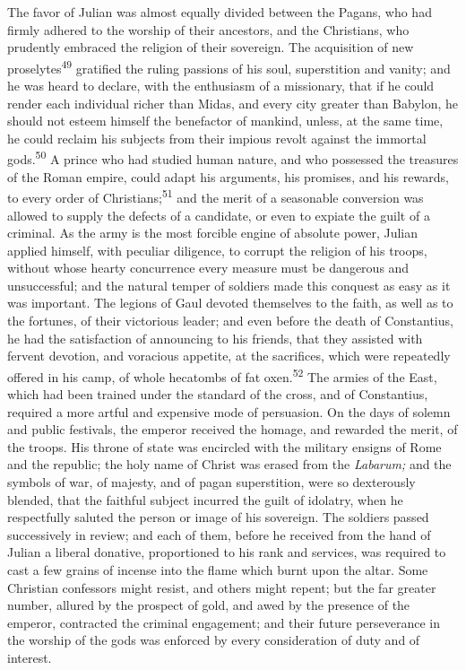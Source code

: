 The favor of Julian was almost equally divided between the
Pagans, who had firmly adhered to the worship of their ancestors,
and the Christians, who prudently embraced the religion of their
sovereign. The acquisition of new proselytes\textsuperscript{49} gratified the
ruling passions of his soul, superstition and vanity; and he was
heard to declare, with the enthusiasm of a missionary, that if he
could render each individual richer than Midas, and every city
greater than Babylon, he should not esteem himself the benefactor
of mankind, unless, at the same time, he could reclaim his
subjects from their impious revolt against the immortal gods.\textsuperscript{50}
A prince who had studied human nature, and who possessed the
treasures of the Roman empire, could adapt his arguments, his
promises, and his rewards, to every order of Christians;\textsuperscript{51} and
the merit of a seasonable conversion was allowed to supply the
defects of a candidate, or even to expiate the guilt of a
criminal. As the army is the most forcible engine of absolute
power, Julian applied himself, with peculiar diligence, to
corrupt the religion of his troops, without whose hearty
concurrence every measure must be dangerous and unsuccessful; and
the natural temper of soldiers made this conquest as easy as it
was important. The legions of Gaul devoted themselves to the
faith, as well as to the fortunes, of their victorious leader;
and even before the death of Constantius, he had the satisfaction
of announcing to his friends, that they assisted with fervent
devotion, and voracious appetite, at the sacrifices, which were
repeatedly offered in his camp, of whole hecatombs of fat oxen.\textsuperscript{52}
The armies of the East, which had been trained under the
standard of the cross, and of Constantius, required a more artful
and expensive mode of persuasion. On the days of solemn and
public festivals, the emperor received the homage, and rewarded
the merit, of the troops. His throne of state was encircled with
the military ensigns of Rome and the republic; the holy name of
Christ was erased from the \textit{Labarum;} and the symbols of war, of
majesty, and of pagan superstition, were so dexterously blended,
that the faithful subject incurred the guilt of idolatry, when he
respectfully saluted the person or image of his sovereign. The
soldiers passed successively in review; and each of them, before
he received from the hand of Julian a liberal donative,
proportioned to his rank and services, was required to cast a few
grains of incense into the flame which burnt upon the altar. Some
Christian confessors might resist, and others might repent; but
the far greater number, allured by the prospect of gold, and awed
by the presence of the emperor, contracted the criminal
engagement; and their future perseverance in the worship of the
gods was enforced by every consideration of duty and of interest.

